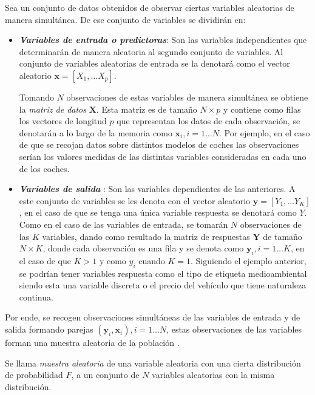 
\noindent Sea un conjunto de datos obtenidos de observar ciertas variables aleatorias de manera simultánea. De ese conjunto de variables se dividirán en:
\begin{itemize}
\item \textbf{\textit{Variables de entrada o predictoras}}: Son las variables independientes que determinarán de manera aleatoria al segundo conjunto de variables. Al conjunto de variables aleatorias de entrada se la denotará como el vector aleatorio $\textbf{x}=[X_1,\ldots X_p]$. \\
\begin{defi}
Tomando $N$ observaciones de estas variables  de manera simultánea se obtiene la \textit{matriz de datos} $\textbf{X}$. Esta matriz es de tamaño $N\times p$ y contiene como filas los vectores de longitud $p$ que representan los datos de cada observación, se denotarán a lo largo de la memoria como $\textbf{x}_i, i=1\ldots N$. Por ejemplo, en el caso de que se recojan datos sobre distintos modelos de coches las observaciones serían los valores medidas de las distintas variables consideradas en cada uno de los coches. 
\end{defi}
\item \textbf{\textit{Variables de salida }}: Son las variables dependientes de las anteriores. A este conjunto de variables se les denota con el vector aleatorio $\textbf{y}=[Y_1,\ldots Y_K]$, en el caso de que se tenga una única variable respuesta se denotará como $Y$. \\
Como en el caso de las variables de entrada, se tomarán $N$ observaciones de las $K$ variables, dando como resultado la matriz de respuestas $\textbf{Y}$ de tamaño $N \times K$, donde cada observación es una fila y se denota como $\mathbf{y}_i, i=1\ldots K$, en el caso de que $K>1$ y como $y_i$ cuando $K=1$. Siguiendo el ejemplo anterior, se podrían tener variables respuesta como el tipo de etiqueta medioambiental siendo esta una variable discreta o el precio del vehículo que tiene naturaleza continua. 
\end{itemize}
\noindent Por ende, se recogen observaciones simultáneas de las variables de entrada y de salida formando parejas $(\mathbf{y}_i,\textbf{x}_i), i=1\ldots N$, estas observaciones de las variables forman una muestra aleatoria de la población .
\begin{defi}
Se llama \emph{muestra aleatoria} de una variable aleatoria con una cierta distribución de probabilidad $F$, a un conjunto de $N$ variables aleatorias con la misma distribución. 
\end{defi} 

